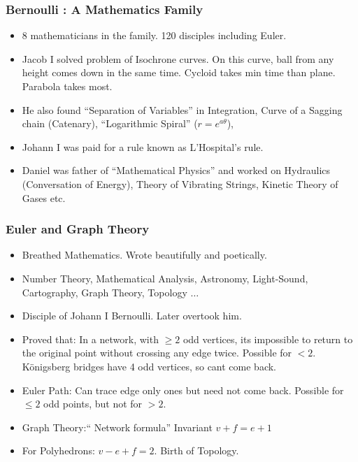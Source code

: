 \begin{frame}[fragile]
\frametitle{Bernoulli : A Mathematics Family}



\begin{itemize}[label=\textbullet,noitemsep,nolistsep]
\item 8 mathematicians in the family. 120 disciples including Euler.
\item Jacob I solved problem of Isochrone curves. On this curve, ball from any height comes down in the same time. Cycloid takes min time than plane. Parabola takes most.
\item He also found ``Separation of Variables'' in Integration, Curve of a Sagging chain (Catenary), ``Logarithmic Spiral'' ($r=e^{a\theta}$),
\item Johann I was paid for a rule known as L'Hospital's rule.
\item Daniel was father of ``Mathematical Physics'' and worked on Hydraulics (Conversation of Energy), Theory of Vibrating Strings, Kinetic Theory of Gases etc.
\end{itemize}
\end{frame}

\begin{frame}[fragile]
\frametitle{Euler and Graph Theory}
\begin{itemize}[label=\textbullet,noitemsep,nolistsep]
\item Breathed Mathematics. Wrote beautifully and poetically. 
\item Number Theory, Mathematical Analysis, Astronomy, Light-Sound, Cartography, Graph Theory, Topology $\ldots$
\item Disciple of Johann I Bernoulli. Later overtook him. 
\item Proved that: In a network, with $ \geq 2$ odd vertices, its impossible to return to the original point without crossing any edge twice. Possible for $< 2$. K\"onigsberg bridges have 4 odd vertices, so cant come back.
\item Euler Path: Can trace edge only ones but need not come back. Possible for $\leq 2$ odd points, but not for $> 2$.
\item Graph Theory:`` Network formula'' Invariant $v + f = e + 1$
\item For Polyhedrons: $v -e + f = 2$. Birth of Topology.
\end{itemize}
\end{frame}

